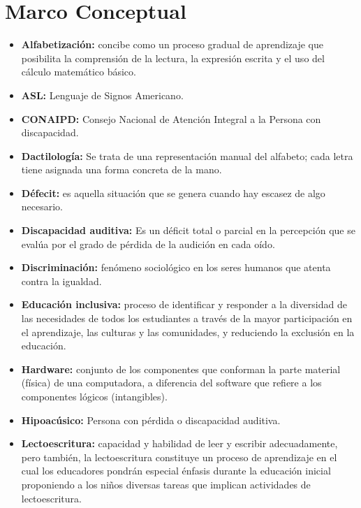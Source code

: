 \documentclass[12pt]{report}%
\begin{document}
\section{Marco Conceptual}
\begin{itemize}


\item \textbf{Alfabetización:} concibe como un proceso gradual de aprendizaje que posibilita la comprensión de la lectura, la expresión escrita y el uso del cálculo matemático básico.

\item \textbf{ASL:} Lenguaje de Signos Americano.

\item \textbf{CONAIPD:} Consejo Nacional de Atención Integral a la Persona con discapacidad.

\item \textbf{Dactilología:} Se trata de una representación manual del alfabeto; cada letra tiene asignada una forma concreta de la mano.

\item \textbf{Défecit: } es aquella situación que se genera cuando hay escasez de algo necesario.

\item \textbf{Discapacidad auditiva: }Es un déficit total o parcial en la percepción que se evalúa por el grado de pérdida de la audición en cada oído.
\item \textbf{Discriminación: }fenómeno sociológico en los seres humanos que atenta contra la igualdad.

\item \textbf{Educación inclusiva: }proceso de identificar y responder a la diversidad de las necesidades de todos los estudiantes a través de la mayor participación en el aprendizaje, las culturas y las comunidades, y reduciendo la exclusión en la educación.

\item \textbf{Hardware:} conjunto de los componentes que conforman la parte material (física) de una computadora, a diferencia del software que refiere a los componentes lógicos (intangibles).

\item \textbf{Hipoacúsico: }Persona con pérdida o discapacidad auditiva.

\item \textbf{Lectoescritura: }capacidad y habilidad de leer y escribir adecuadamente, pero también, la lectoescritura constituye un proceso de aprendizaje en el cual los educadores pondrán especial énfasis durante la educación inicial proponiendo a los niños diversas tareas que implican actividades de lectoescritura.


\end{itemize}
\end{document}
